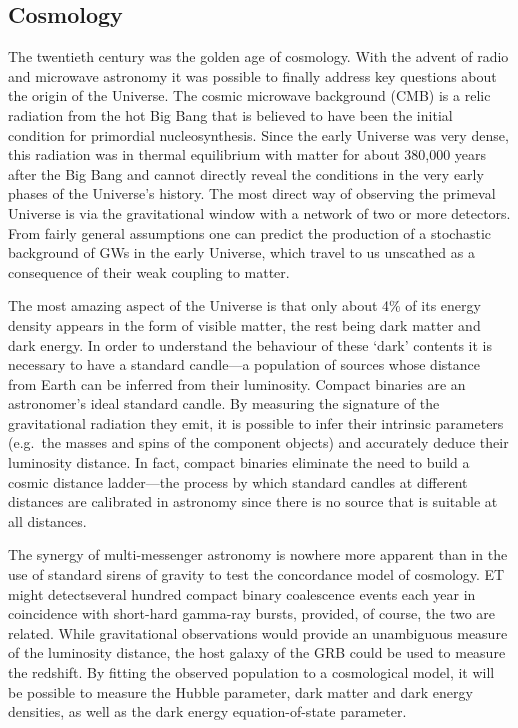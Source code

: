 \subsection{Cosmology}
The twentieth century was the golden age of cosmology. With the advent of radio and microwave astronomy it was possible to finally address key questions about the origin of the Universe.  
The cosmic microwave background (CMB) is a relic radiation from the hot Big Bang that is believed to have been the initial condition for primordial nucleosynthesis.
Since the early Universe was very dense, this radiation was in thermal equilibrium with matter for about 380,000 years after the Big Bang and cannot directly reveal the conditions in the very early phases of the Universe's history. 
The most direct way of observing the primeval Universe is via the gravitational window with a network of two or more detectors. 
From fairly general assumptions one can predict the production of a stochastic background of GWs in the early Universe, which travel to us unscathed as a consequence of their weak coupling to matter.

The most amazing aspect of the Universe is that only about 4\% of its energy density appears in the form of visible matter, the rest being dark matter and dark energy. 
In order to understand the behaviour of these `dark' contents it is necessary to have a standard candle---a population of sources whose distance from Earth can be inferred from their luminosity. 
Compact binaries are an astronomer's ideal standard candle. 
By measuring the signature of the gravitational radiation they emit, it is possible to infer their intrinsic parameters (e.g.\ the masses and spins of the component objects) and accurately deduce their luminosity distance. In fact, compact binaries
eliminate the need to build a cosmic distance ladder---the process by which standard candles at different distances are calibrated in astronomy since there is no source that is suitable at all distances.

The synergy of multi-messenger astronomy is nowhere more apparent than in the use of standard sirens of gravity to test the concordance model of cosmology.  ET might detectseveral hundred compact  binary coalescence events each year in coincidence with short-hard gamma-ray bursts, provided, of course, the two are related.  While gravitational observations would provide an unambiguous measure of the luminosity distance, the host galaxy of the GRB could be used to measure the redshift. By fitting the observed population to a cosmological model, it will be possible to measure the Hubble parameter, dark matter and dark energy densities, as well as the dark energy equation-of-state parameter.


